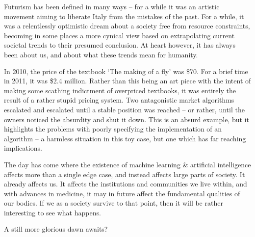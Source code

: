 Futurism has been defined in many ways – for a while it was an artistic movement aiming to liberate Italy from the mistakes of the past. For a while, it was a relentlessly optimistic dream about a society free from resource constraints, becoming in some places a more cynical view based on extrapolating current societal trends to their presumed conclusion. At heart however, it has always been about us, and about what these trends mean for humanity.

In 2010, the price of the textbook `The making of a fly’ was \$70. For a brief time in 2011, it was \$2.4 million. Rather than this being an art piece with the intent of making some scathing indictment of overpriced textbooks, it was entirely the result of a rather stupid pricing system. Two antagonistic market algorithms escalated and escalated until a stable position was reached – or rather, until the owners noticed the absurdity and shut it down. This is an absurd example, but it highlights the problems with poorly specifying the implementation of an algorithm – a harmless situation in this toy case, but one which has far reaching implications.

The day has come where the existence of machine learning \& artificial intelligence affects more than a single edge case, and instead affects large parts of society. It already affects us.  It affects the institutions and communities we live within, and with advances in medicine, it may in future affect the fundamental qualities of our bodies. If we as a society survive to that point, then it will be rather interesting to see what happens.

A still more glorious dawn awaits?